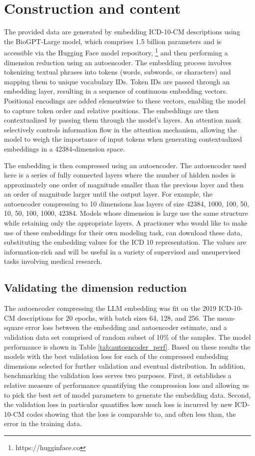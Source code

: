 \documentclass{bmcart}
\begin{document}
\section*{Construction and content}

The provided data are generated by embedding ICD-10-CM descriptions using the 
BioGPT-Large model, which comprises 1.5 billion parameters and is accessible 
via the Hugging Face model repository, \footnote{https://hugginface.co} and
then performing a dimension reduction using an autoencoder. 
The embedding process involves tokenizing 
textual phrases into tokens (words, subwords, or characters) and mapping them 
to unique vocabulary IDs. Token IDs are passed through an embedding layer, 
resulting in a sequence of continuous embedding vectors. Positional encodings 
are added elementwise to these vectors, enabling the model to capture token 
order and relative positions. The embeddings are then contextualized by 
passing them through the model's layers. An attention mask selectively 
controls information flow in the attention mechanism, allowing the model to 
weigh the importance of input tokens when generating contextualized embeddings 
in a 42384-dimension space.

The embedding is then compressed using an autoencoder. The autoencoder used
here is 
a series of fully connected layers where the number of hidden nodes is 
approximately one order of magnitude smaller than the previous layer and then 
an order of magnitude larger until the output layer.  For example, the 
autoencoder compressing to 10 dimensions has layers of size 42384, 1000,
100, 50, 10, 50, 100, 1000, 42384. Models whose dimension is large use 
the same structure while retaining only the appropriate layers. 
A practioner who would like to make use of these embeddings for their
own modeling task, can download 
these data, substituting the embedding values for the ICD 10 representation.
The values are information-rich and will be useful in a variety of 
supervised and unsupervised tasks involving medical research.

\subsection*{Validating the dimension reduction}

The autoencoder compressing the LLM embedding was fit on the 2019 ICD-10-CM 
descriptions for 20 epochs, with batch sizes 64, 128, and 256. The mean-square 
error loss between the embedding and autoencoder estimate, and a validation 
data set comprised of random subset of 10\% of the samples. The model 
performance is shown in Table \ref{tab:autoencoder_perf}.  
Based on these results the models with the best 
validation loss for each of the compressed embedding dimensions selected 
for further validation and eventual distribution. In addition,
benchmarking the validation loss serves two purposes. First, it establishes
a relative measure of performance quantifying the compression loss and allowing
us to pick the best set of model parameters to generate the embedding
data. Second, the validation loss in particular quantifies how much loss
is incurred by new ICD-10-CM codes showing that the loss is comparable to,
and often less than, the error in the training data. 
\end{document}
